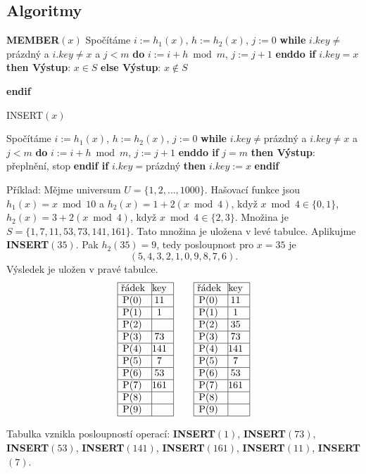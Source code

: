 \documentclass[a4paper,12pt]{article}
\begin{document}
\subsection{
Algoritmy
}


{\bf MEMBER$(x)$}\newline 
Spočítáme $i:=h_1(x)$, $h:=h_2(x)$, $j:=0$\newline 
{\bf while} $i.key\ne$prázdný a $i.key\ne x$ a $j<m$ {\bf do} $
i:=i+h\bmod m$, $j:=j+1$ {\bf enddo\newline 
if} $i.key=x$ {\bf then Výstup}: $x\in S$ {\bf else Výstup}: $
x\notin S$ {\bf endif


INSERT$(x)$}\newline 
Spočítáme $i:=h_1(x)$, $h:=h_2(x)$, $j:=0$\newline 
{\bf while} $i.key\ne$prázdný a $i.key\ne x$ a $j<m$ {\bf do} $
i:=i+h\bmod m$, $j:=j+1$ {\bf enddo\newline 
if} $j=m$ {\bf then Výstup}: přeplnění, stop {\bf endif\newline 
if} $i.key=$prázdný {\bf then} $i.key:=x$ {\bf endif}


Příklad: Mějme universum $U=\{1,2,\dots,1000
\}$. 
Hašovací funkce jsou 
$h_1(x)=x\bmod10$ a $h_2(x)=1+2(x\bmod4)$, když 
$x\bmod4\in \{0,1\}$, $h_2(x)=3+2(x\bmod4)$, když $x\bmod4\in 
\{2,3\}$. 
Množina je  $S=\{1,7,11,53,73,141,161\}$. Tato množina je uložena v 
levé tabulce. Aplikujme {\bf INSERT$(35)$}. Pak $h_2(35)=9$, tedy 
posloupnost pro $x=35$ je 
$$(5,4,3,2,1,0,9,8,7,6).$$
Výsledek je uložen v pravé tabulce. 
$$\vbox {\hbox{\vtop{\offinterlineskip\halign{\strut\vrule\ # & \vrule\hfil# \hfil\vrule\cr\noalign{\hrule}řádek & key \hfil\cr\noalign{\hrule}P(0) & 11 \cr\noalign{\hrule}P(1) & 1 \cr\noalign{\hrule}P(2) & \hfill \cr\noalign{\hrule}P(3) & 73 \cr\noalign{\hrule}P(4) & 141 \cr\noalign{\hrule}P(5) & 7 \cr\noalign{\hrule}P(6) & 53 \cr\noalign{\hrule}P(7) & 161 \cr\noalign{\hrule}P(8) & \hfill\cr\noalign{\hrule}P(9) & \hfill \cr\noalign{\hrule}}}\qquad\vtop{\offinterlineskip\halign {\strut\vrule\ # & \vrule \hfil # \hfil \vrule\cr\noalign{\hrule}řádek & key \hfil \cr\noalign{\hrule}P(0) & 11 \cr\noalign{\hrule}P(1) & 1 \cr\noalign{\hrule}P(2) & 35 \cr\noalign{\hrule}P(3) & 73 \cr\noalign{\hrule}P(4) & 141 \cr\noalign{\hrule}P(5) & 7 \cr\noalign{\hrule}P(6) & 53 \cr\noalign{\hrule}P(7) & 161 \cr\noalign{\hrule}P(8) & \hfill \cr\noalign{\hrule}P(9) & \hfill \cr\noalign{\hrule}}}}}$$

Tabulka vznikla posloupností operací:\newline 
{\bf INSERT$(1)$}, {\bf INSERT$(73)$}, {\bf INSERT$(53)$}, 
{\bf INSERT$(141)$}, {\bf INSERT$(161)$},\newline 
{\bf INSERT$(11)$}, {\bf INSERT$(7)$}. 
\end{document}
